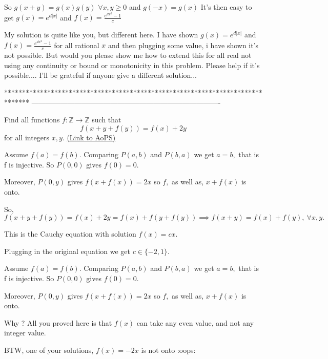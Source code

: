 \begin{solution}
	\begin{tcolorbox}

So $g(x+y)=g(x)g(y)$ $\forall x,y\ge 0$ and $g(-x)=g(x)$
It's then easy to get $g(x)=e^{d|x|}$ and $f(x)=\frac{e^{dx^2}-1}c$
\end{tcolorbox}
My solution is quite like you, but different here. I have shown $g(x)=e^{d|x|}$ and $f(x)=\frac{e^{dx^2}-1}c$ for all rational $x$ and then plugging some value, i have shown it's not possible. But would you please show me how to extend this for all real not using any continuity or bound or monotonicity in this problem. Please help if it's possible.... I'll be grateful  if anyone give a different solution...
\end{solution}
*******************************************************************************
-------------------------------------------------------------------------------

\begin{problem}
	Find all functions $ f:\mathbb{Z}\rightarrow \mathbb{Z} $ such that \[f(x+y+f(y))=f(x)+2y\]
for all integers $ x,y $.
	\flushright \href{https://artofproblemsolving.com/community/c6h477857}{(Link to AoPS)}
\end{problem}



\begin{solution}
	Assume $f(a)=f(b)$. Comparing $P(a,b)$ and $P(b,a)$ we get $a=b,$ that is f is injective.
So $P(0,0)$ gives $f(0)=0.$

Moreover, $P(0,y)$ gives $f(x+f(x))=2x$ so $f,$ as well as, $x+f(x)$ is onto.

So, 
$ f(x+y+f(y))=f(x)+2y=f(x)+f(y+f(y))\implies f(x+y)=f(x)+f(y), \ \forall x,y .$

This is the Cauchy equation with solution $f(x)=cx.$

Plugging in the original equation we get $c\in \{-2,1\}.$
\end{solution}



\begin{solution}
	\begin{tcolorbox}Assume $f(a)=f(b)$. Comparing $P(a,b)$ and $P(b,a)$ we get $a=b,$ that is f is injective.
So $P(0,0)$ gives $f(0)=0.$

Moreover, $P(0,y)$ gives $f(x+f(x))=2x$ so $f,$ as well as, $x+f(x)$ is onto.\end{tcolorbox}

Why ? 
All you proved here is that $f(x)$ can take any even value, and not any integer value.

BTW, one of your solutions, $f(x)=-2x$ is not onto :oops:
\end{solution}



